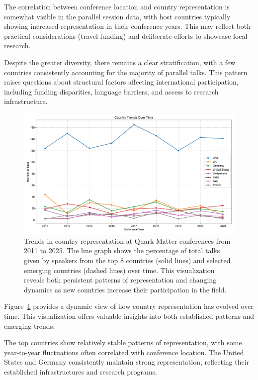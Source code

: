 \documentclass[a4paper,11pt]{article}
\begin{document}
The correlation between conference location and country representation is somewhat visible in the parallel session data, with host countries typically showing increased representation in their conference years. This may reflect both practical considerations (travel funding) and deliberate efforts to showcase local research.

Despite the greater diversity, there remains a clear stratification, with a few countries consistently accounting for the majority of parallel talks. This pattern raises questions about structural factors affecting international participation, including funding disparities, language barriers, and access to research infrastructure.

\begin{figure}[H]
\centering
\includegraphics[width=\textwidth]{figures/country_trends_over_time.pdf}
\caption{Trends in country representation at Quark Matter conferences from 2011 to 2025. The line graph shows the percentage of total talks given by speakers from the top 8 countries (solid lines) and selected emerging countries (dashed lines) over time. This visualization reveals both persistent patterns of representation and changing dynamics as new countries increase their participation in the field.}
\label{fig:country_trends}
\end{figure}

Figure~\ref{fig:country_trends} provides a dynamic view of how country representation has evolved over time. This visualization offers valuable insights into both established patterns and emerging trends:

The top countries show relatively stable patterns of representation, with some year-to-year fluctuations often correlated with conference location. The United States and Germany consistently maintain strong representation, reflecting their established infrastructures and research programs.
\end{document}
